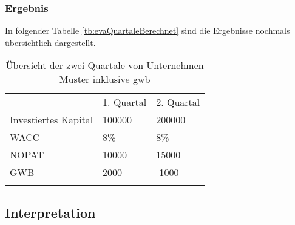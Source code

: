 \subsubsection{Ergebnis}

In folgender Tabelle \eqref{tb:evaQuartaleBerechnet} sind die Ergebnisse nochmals übersichtlich dargestellt.

\begin{table}[!h]
    \begin{tabular}{lll}
        \cline{1-3} \rowcolor{gray}
                             & 1. Quartal & 2. Quartal \\ \cline{1-3} \rowcolor{white}
        Investiertes Kapital & 100000     & 200000     \\ \cline{1-3} \rowcolor{white}
        WACC                 & 8\%        & 8\%        \\ \cline{1-3} \rowcolor{white}
        NOPAT                & 10000      & 15000      \\ \hline \rowcolor{white}
        GWB                  & 2000       & -1000      \\ \cline{1-3} \rowcolor{white}
    \end{tabular}
    \caption{Übersicht der zwei Quartale von Unternehmen Muster inklusive \ac{gwb}}
    \label{tb:evaQuartaleBerechnet}
\end{table}

\subsection{Interpretation}

